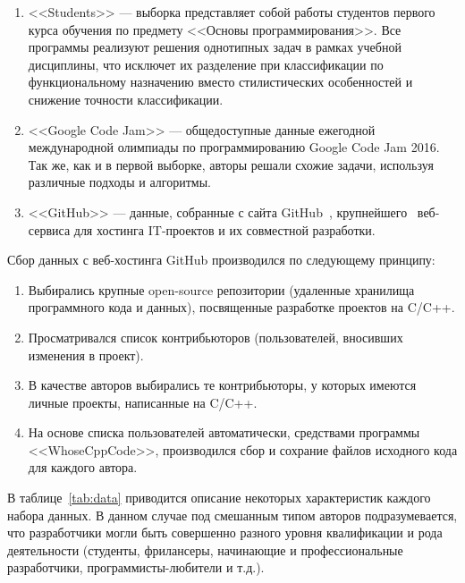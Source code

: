 \begin{enumerate}
 \item <<Students>> --- выборка представляет собой работы студентов первого курса обучения по 
 предмету <<Основы программирования>>. Все программы реализуют решения однотипных задач в рамках учебной 
 дисциплины, что исключет их разделение при классификации по функциональному назначению вместо 
 стилистических особенностей и снижение точности классификации. 
 \item <<Google Code Jam>> --- общедоступные данные ежегодной международной олимпиады по программированию Google Code Jam 
 2016.~\cite{GoogleCodeJam} Так же, как и в первой выборке, авторы решали схожие задачи, используя различные
 подходы и алгоритмы. 
\item <<GitHub>> --- данные, собранные с сайта GitHub~\cite{GitHub}, крупнейшего~\cite{GH_domain} 
веб-сервиса для хостинга IT-проектов и их совместной разработки. 
\end{enumerate}


Сбор данных с веб-хостинга GitHub производился по следующему принципу: 
\begin{enumerate}
 \item Выбирались крупные open-source репозитории (удаленные хранилища программного кода и данных),  
 посвященные разработке проектов на C/C++.
 \item Просматривался список контрибьюторов (пользователей, вносивших изменения в проект).
 \item В качестве авторов выбирались те контрибьюторы, у которых имеются личные проекты, написанные 
 на C/C++.
 \item На основе списка пользователей автоматически, средствами программы <<WhoseCppCode>>, производился
 сбор и сохрание файлов исходного кода для каждого автора. 
\end{enumerate}

В таблице~\ref{tab:data} приводится описание некоторых характеристик каждого набора данных.
В данном случае под смешанным типом авторов подразумевается, что разработчики могли быть совершенно
разного уровня квалификации и рода деятельности (студенты, фрилансеры, начинающие и 
профессиональные разработчики, программисты-любители и т.д.).

